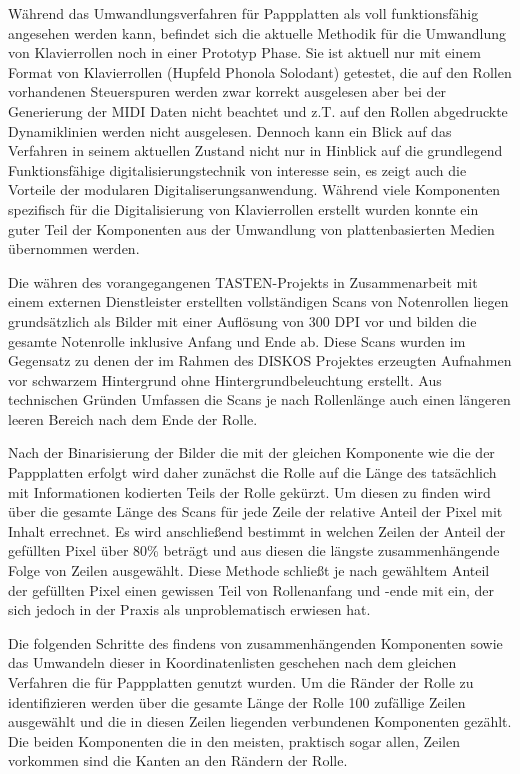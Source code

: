Während das Umwandlungsverfahren für Pappplatten als voll funktionsfähig angesehen werden kann, befindet sich die aktuelle Methodik für die Umwandlung von Klavierrollen noch in einer Prototyp Phase.
Sie ist aktuell nur mit einem Format von Klavierrollen (Hupfeld Phonola Solodant) getestet, die auf den Rollen vorhandenen Steuerspuren werden zwar korrekt ausgelesen aber bei der Generierung der MIDI Daten nicht beachtet und z.T. auf den Rollen abgedruckte Dynamiklinien werden nicht ausgelesen.
Dennoch kann ein Blick auf das Verfahren in seinem aktuellen Zustand nicht nur in Hinblick auf die grundlegend Funktionsfähige digitalisierungstechnik von interesse sein, es zeigt auch die Vorteile der modularen Digitaliserungsanwendung.
Während viele Komponenten spezifisch für die Digitalisierung von Klavierrollen erstellt wurden konnte ein guter Teil der Komponenten aus der Umwandlung von plattenbasierten Medien übernommen werden.

Die währen des vorangegangenen TASTEN-Projekts in Zusammenarbeit mit einem externen Dienstleister erstellten vollständigen Scans von Notenrollen liegen grundsätzlich als Bilder mit einer Auflösung von 300 DPI vor und bilden die gesamte Notenrolle inklusive Anfang und Ende ab.
Diese Scans wurden im Gegensatz zu denen der im Rahmen des DISKOS Projektes erzeugten Aufnahmen vor schwarzem Hintergrund ohne Hintergrundbeleuchtung erstellt.
Aus technischen Gründen Umfassen die Scans je nach Rollenlänge auch einen längeren leeren Bereich nach dem Ende der Rolle.

Nach der Binarisierung der Bilder die mit der gleichen Komponente wie die der Pappplatten erfolgt wird daher zunächst die Rolle auf die Länge des tatsächlich mit Informationen kodierten Teils der Rolle gekürzt.
Um diesen zu finden wird über die gesamte Länge des Scans für jede Zeile der relative Anteil der Pixel mit Inhalt errechnet.
Es wird anschließend bestimmt in welchen Zeilen der Anteil der gefüllten Pixel über 80\% beträgt und aus diesen die längste zusammenhängende Folge von Zeilen ausgewählt.
Diese Methode schließt je nach gewähltem Anteil der gefüllten Pixel einen gewissen Teil von Rollenanfang und -ende mit ein, der sich jedoch in der Praxis als unproblematisch erwiesen hat.

Die folgenden Schritte des findens von zusammenhängenden Komponenten sowie das Umwandeln dieser in Koordinatenlisten geschehen nach dem gleichen Verfahren die für Pappplatten genutzt wurden.
Um die Ränder der Rolle zu identifizieren werden über die gesamte Länge der Rolle 100 zufällige Zeilen ausgewählt und die in diesen Zeilen liegenden verbundenen Komponenten gezählt.
Die beiden Komponenten die in den meisten, praktisch sogar allen, Zeilen vorkommen sind die Kanten an den Rändern der Rolle.

